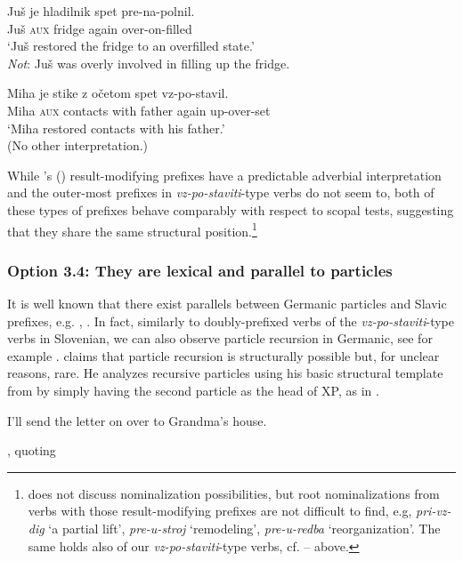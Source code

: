 \documentclass[output=paper,colorlinks,citecolor=brown]{langscibook}
\begin{document}
\ea \label{ex:prespet}\gll Juš je hladilnik spet pre-na-polnil.\\
Juš \textsc{aux} fridge again {over-on}-filled\\
\glt `Juš restored the fridge to an overfilled state.'\\
\textit{Not}: Juš was overly involved in filling up the fridge. \hfill \citep[293]{zaucer2013} 
\z

\ea \label{ex:spetvzpostaviti}\gll Miha je stike z očetom spet vz-po-stavil.\\
Miha \textsc{aux} contacts with father again {up-over}-set\\
\glt `Miha restored contacts with his father.'\\
(No other interpretation.)
\z

\noindent  While \citeauthor{zaucer2013}'s (\citeyear{zaucer2013}) result-modifying prefixes have a predictable adverbial interpretation and the outer-most prefixes in \textit{vz-po-staviti}-type verbs do not seem to, both of these types of prefixes behave comparably with respect to scopal tests, suggesting that they share the same structural position.\footnote{\citet{zaucer2013} does not discuss nominalization possibilities, but root nominalizations from verbs with those result-modifying prefixes are not difficult to find, e.g, \textit{pri-vz-dig} `a partial lift', \textit{pre-u-stroj} `remodeling', \textit{pre-u-redba} `reorganization'. The same holds also of our \textit{vz-po-staviti}-type verbs, cf. -- above.} 


\subsubsection{Option 3.4: They are lexical and parallel to particles}
It is well known that there exist parallels between Germanic particles and Slavic prefixes, e.g. \citet{spencer&zaretskaya1998}, \citet{svenonius2004slavic}.
In fact, similarly to doubly-prefixed verbs of the \textit{vz-po-staviti}-type verbs in Slovenian, we can also observe particle recursion in Germanic, see for example \citet[80]{den1995particles}. \citet{den1995particles} claims that particle recursion is structurally
possible but, for unclear reasons, rare. He analyzes recursive particles using his basic structural template from  by simply having the second particle as the head of XP, as in .   
    
\ea I'll send the letter on over to Grandma's
    house. \\ \strut \hfill \citet[(116b)]{den1995particles}, quoting \citet{di1994modifying} \label{ex:onover}
\z
\end{document}
